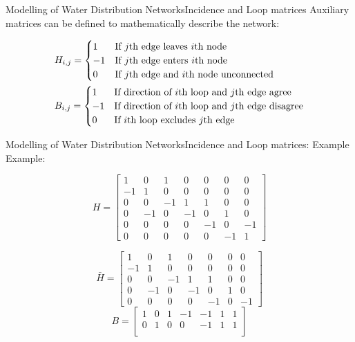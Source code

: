\begin{frame}{Modelling of Water Distribution Networks}{Incidence and Loop matrices}
Auxiliary matrices can be defined to mathematically describe the network:


\begin{equation*}
	\begin{aligned}
		&H_{i,j} = \begin{cases}
			1 & \text{If $j$th edge leaves $i$th node}\\
			-1 & \text{If $j$th edge enters $i$th node} \\
			0 & \text{If $j$th edge and $i$th node unconnected} 
		\end{cases} \\
		&B_{i,j} = \begin{cases}
			1 & \text{If direction of $ i $th loop and} \text{ $j$th edge agree}\\
			-1 & \text{If direction of $ i $th loop and} \text{ $j$th edge disagree}\\
			0 & \text{If $ i $th loop excludes $ j $th edge}\\
		\end{cases}
	\end{aligned}
\end{equation*}

\end{frame}


\begin{frame}{Modelling of Water Distribution Networks}{Incidence and Loop matrices: Example}
Example:

\begin{equation}
	H = \begin{bmatrix}
		1 & 0 & 1 & 0 & 0 & 0 & 0\\
		-1 & 1 & 0 & 0 & 0 & 0 & 0\\
		0 & 0 & -1 & 1 & 1 & 0 & 0\\
		0 & -1 & 0 & -1 & 0 & 1 & 0\\
		0 & 0 & 0 & 0 & -1 &  0  & -1\\
		0 & 0 & 0 & 0 & 0 & -1 & 1
	\end{bmatrix}
	\label{eq:H_simplified}
\end{equation} 

\begin{equation}
	\bar{H} = \begin{bmatrix}
		1 & 0 & 1 & 0 & 0 & 0 & 0\\
		-1 & 1 & 0 & 0 & 0 & 0 & 0\\
		0 & 0 & -1 & 1 & 1 & 0 & 0\\
		0 & -1 & 0 & -1 & 0 & 1 & 0\\
		0 & 0 & 0 & 0 & -1 &  0  & -1
	\end{bmatrix}
\end{equation}
\begin{equation}
	B = \begin{bmatrix}
		1 & 0 & 1 & -1 & -1 & 1 & 1\\
		0 & 1 & 0 & 0 & -1 & 1 & 1\\
	\end{bmatrix}
\end{equation}
\end{frame}


